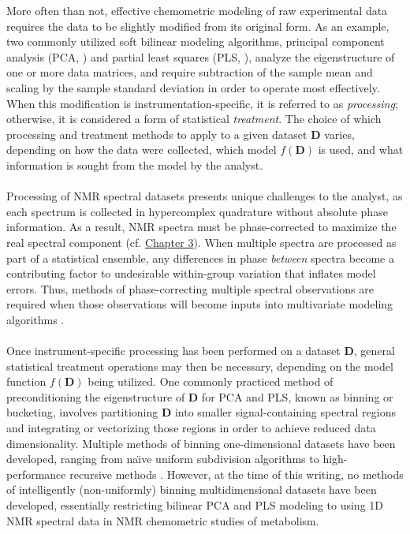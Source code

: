 \begin{doublespace}
More often than not, effective chemometric modeling of raw experimental data
requires the data to be slightly modified from its original form. As an
example, two commonly utilized soft bilinear modeling algorithms, principal
component analysis (PCA, \cite{jolliffe2002}) and partial least squares
(PLS, \cite{wold1993}), analyze the eigenstructure of one or more data
matrices, and require subtraction of the sample mean and scaling by the sample
standard deviation in order to operate most effectively. When this modification
is instrumentation-specific, it is referred to as {\it processing}; otherwise,
it is considered a form of statistical {\it treatment}. The choice of which
processing and treatment methods to apply to a given dataset $\mathbf{D}$
varies, depending on how the data were collected, which model $f(\mathbf{D})$
is used, and what information is sought from the model by the analyst.
\\\\
Processing of NMR spectral datasets presents unique challenges to the analyst,
as each spectrum is collected in hypercomplex quadrature
\cite{schuyler:jmr2013} without absolute phase information. As a result,
NMR spectra must be phase-corrected to maximize the real spectral component
(cf. \hyperlink{chapter.3}{Chapter 3}). When multiple spectra are processed as
part of a statistical ensemble, any differences in phase {\it between} spectra
become a contributing factor to undesirable within-group variation that
inflates model errors. Thus, methods of phase-correcting multiple spectral
observations are required when those observations will become inputs into
multivariate modeling algorithms \cite{worley:cils2014}.
\\\\
Once instrument-specific processing has been performed on a dataset
$\mathbf{D}$, general statistical treatment operations may then be necessary,
depending on the model function $f(\mathbf{D})$ being utilized. One commonly
practiced method of preconditioning the eigenstructure of $\mathbf{D}$ for
PCA and PLS, known as binning or bucketing, involves partitioning $\mathbf{D}$
into smaller signal-containing spectral regions and integrating or vectorizing
those regions in order to achieve reduced data dimensionality. Multiple methods
of binning one-dimensional datasets have been developed, ranging from
na\"{\i}ve uniform subdivision algorithms
\cite{hedenstrom:cils2008,sousa:cils2013} to high-performance recursive
methods \cite{davis:cils2007,demeyer:anchem2008}. However, at the time
of this writing, no methods of intelligently (non-uniformly) binning
multidimensional datasets have been developed, essentially restricting bilinear
PCA and PLS modeling to using 1D \hnmr{} NMR spectral data in NMR chemometric
studies of metabolism.
\end{doublespace}

